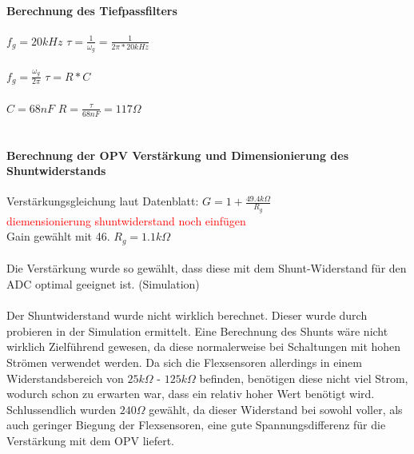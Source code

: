 \documentclass[titlepage,12pt,twoside]{article}
\begin{document}
\paragraph{Berechnung des Tiefpassfilters}
\hfill \break
\hfill \break
\hspace*{1cm} $f_{g} = 20 kHz $ \hspace*{1cm} $\tau = \frac{1}{\omega_{g}} = \frac{1}{2\pi * 20 kHz} $ \\
\\
\hspace*{1cm} $f_{g} = \frac{\omega_{g}}{2\pi} $ \hspace*{1.7cm} $\tau = R * C $ \\
\\
\hspace*{4.25cm} $ C = 68 nF $ \hspace*{1cm} $ R = \frac{\tau}{68nF} = 117 \Omega $ \\
\\
\paragraph{Berechnung der OPV Verstärkung und Dimensionierung des Shuntwiderstands}
\hfill \break
\hfill \break
\hspace*{1cm} Verstärkungsgleichung laut Datenblatt: $ G = 1+\frac{49.4k\Omega}{R_{g}} $ \\
\textcolor{red}{diemensionierung shuntwiderstand noch einfügen}
\\
\hspace*{1cm} Gain gewählt mit 46. \hspace*{1cm} $ R_{g} = 1.1k\Omega $ \\
\\
Die Verstärkung wurde so gewählt, dass diese mit dem Shunt-Widerstand für den ADC optimal geeignet ist. (Simulation) \\
\\
Der Shuntwiderstand wurde nicht wirklich berechnet. Dieser wurde durch probieren in der Simulation ermittelt. Eine Berechnung
des Shunts wäre nicht wirklich Zielführend gewesen, da diese normalerweise bei Schaltungen mit hohen Strömen verwendet werden. 
Da sich die Flexsensoren allerdings in einem Widerstandsbereich von $25k\Omega$ - $125k\Omega$ befinden, benötigen diese nicht
viel Strom, wodurch schon zu erwarten war, dass ein relativ hoher Wert benötigt wird. Schlussendlich wurden $240\Omega$ gewählt,
da dieser Widerstand bei sowohl voller, als auch geringer Biegung der Flexsensoren, eine gute Spannungsdifferenz für die 
Verstärkung mit dem OPV liefert. \\
\\
\end{document}
